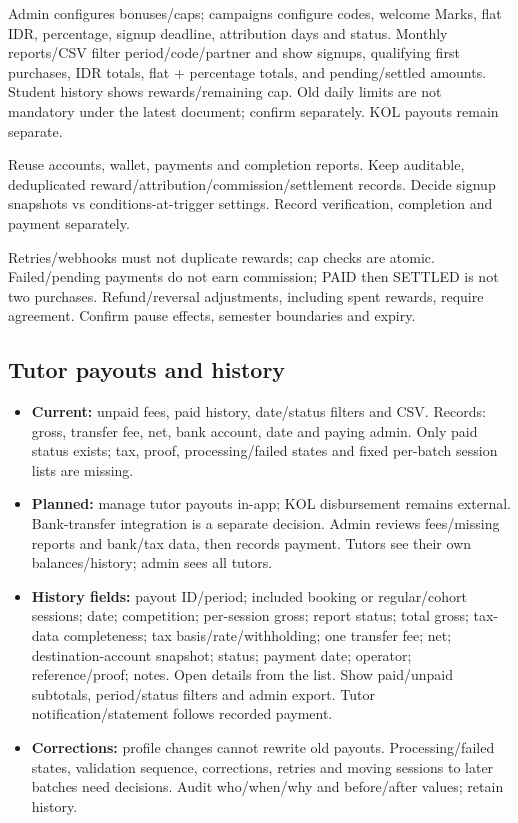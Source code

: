 \documentclass[11pt,a4paper]{article}
\begin{document}
Admin configures bonuses/\allowbreak{}caps; campaigns configure codes, welcome Marks, flat IDR, percentage, signup deadline, attribution days and status. Monthly reports/\allowbreak{}CSV filter period/\allowbreak{}code/\allowbreak{}partner and show signups, qualifying first purchases, IDR totals, flat + percentage totals, and pending/\allowbreak{}settled amounts. Student history shows rewards/\allowbreak{}remaining cap. Old daily limits are not mandatory under the latest document; confirm separately. KOL payouts remain separate.

Reuse accounts, wallet, payments and completion reports. Keep auditable, deduplicated reward/\allowbreak{}attribution/\allowbreak{}commission/\allowbreak{}settlement records. Decide signup snapshots vs conditions-at-trigger settings. Record verification, completion and payment separately.

Retries/\allowbreak{}webhooks must not duplicate rewards; cap checks are atomic. Failed/\allowbreak{}pending payments do not earn commission; PAID then SETTLED is not two purchases. Refund/\allowbreak{}reversal adjustments, including spent rewards, require agreement. Confirm pause effects, semester boundaries and expiry.

\subsection*{Tutor payouts and history}

\begin{itemize}
\item \textbf{Current:} unpaid fees, paid history, date/\allowbreak{}status filters and CSV. Records: gross, transfer fee, net, bank account, date and paying admin. Only paid status exists; tax, proof, processing/\allowbreak{}failed states and fixed per-batch session lists are missing.
\item \textbf{Planned:} manage tutor payouts in-app; KOL disbursement remains external. Bank-transfer integration is a separate decision. Admin reviews fees/\allowbreak{}missing reports and bank/\allowbreak{}tax data, then records payment. Tutors see their own balances/\allowbreak{}history; admin sees all tutors.
\item \textbf{History fields:} payout ID/\allowbreak{}period; included booking or regular/\allowbreak{}cohort sessions; date; competition; per-session gross; report status; total gross; tax-data completeness; tax basis/\allowbreak{}rate/\allowbreak{}withholding; one transfer fee; net; destination-account snapshot; status; payment date; operator; reference/\allowbreak{}proof; notes. Open details from the list. Show paid/\allowbreak{}unpaid subtotals, period/\allowbreak{}status filters and admin export. Tutor notification/\allowbreak{}statement follows recorded payment.
\item \textbf{Corrections:} profile changes cannot rewrite old payouts. Processing/\allowbreak{}failed states, validation sequence, corrections, retries and moving sessions to later batches need decisions. Audit who/\allowbreak{}when/\allowbreak{}why and before/\allowbreak{}after values; retain history.
\end{itemize}
\end{document}
